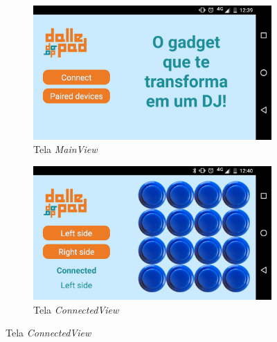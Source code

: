 \documentclass[hyperref={pdfpagelabels=false}]{beamer}
\begin{document}
\begin{frame}
                    \begin{figure}[H]
                        \centering
                        \begin{subfigure}[b]{.45\textwidth}
                            \centering
                            \includegraphics[scale=0.13]{Imagens/mainview.png}
                        	\caption[Tela \textit{MainView}]{Tela \textit{MainView}}
                            \label{fig:43}
                        \end{subfigure} %
                        \begin{subfigure}[b]{.45\textwidth}
                            \centering
                            \includegraphics[scale=0.13]{Imagens/connectedview.png}
                        	\caption[Tela \textit{ConnectedView}]{Tela \textit{ConnectedView}}
                        	\label{fig:44}
                        \end{subfigure}

                        \label{fig:madeiratriplex}
                    \end{figure}

                \end{frame}
\end{document}
